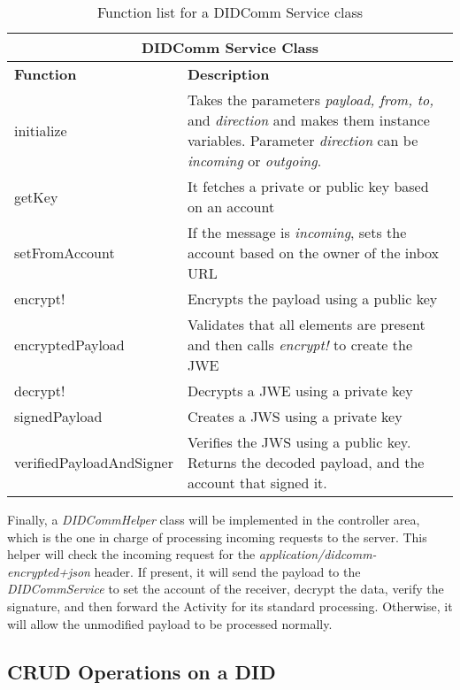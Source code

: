 \begin{table}[H]
  \centering
  \begin{tabular}{|p{5cm}|p{10cm}| }
    \hline
    \multicolumn{2}{|c|}{DIDComm Service Class} \\
    \hline
    \textbf{Function} & \textbf{Description} \\
    \hline
    \hline
    initialize & Takes the parameters \emph{payload, from, to,} and \emph{direction} and makes them instance variables. Parameter \emph{direction} can be \emph{incoming} or \emph{outgoing}. \\
    \hline
    getKey & It fetches a private or public key based on an account\\
    \hline
    setFromAccount & If the message is \emph{incoming}, sets the account based on the owner of the inbox URL\\
    \hline
    encrypt! & Encrypts the payload using a public key\\
    \hline
    encryptedPayload & Validates that all elements are present and then calls \emph{encrypt!} to create the JWE\\
    \hline
    decrypt! & Decrypts a JWE using a private key\\ 
    \hline
    signedPayload & Creates a JWS using a private key\\ 
    \hline
    verifiedPayloadAndSigner & Verifies the JWS using a public key. Returns the decoded payload, and the account that signed it. \\
    \hline
  \end{tabular}
  \caption{Function list for a DIDComm Service class}
  \label{table:didcomm_service}
\end{table}

Finally, a \emph{DIDCommHelper} class will be implemented in the controller area, which is the one in charge of processing incoming requests to the server. This helper will check the incoming request for the \emph{application/didcomm-encrypted+json} header. If present, it will send the payload to the \emph{DIDCommService} to set the account of the receiver, decrypt the data, verify the signature, and then forward the Activity for its standard processing. Otherwise, it will allow the unmodified payload to be processed normally.



\subsection{CRUD Operations on a DID}\label{subsec:did_crud}

